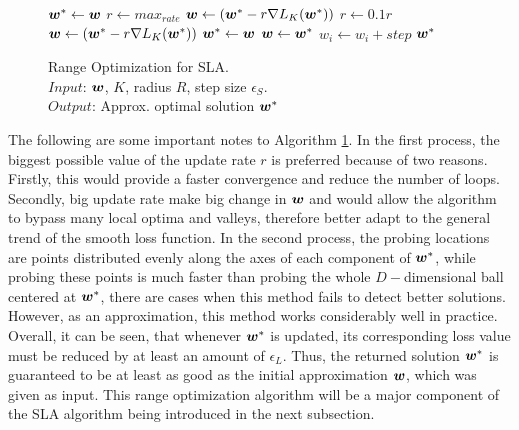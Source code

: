 \begin{figure}[tp!]
\vspace{-3mm}
\caption{\footnotesize
Range Optimization for SLA.\hfill\;\\
\text{\hspace{1.4cm}} $Input$: $\boldsymbol{w}$, $K$, radius $R$, step size $\epsilon_S$. \\
\text{\hspace{1.4cm}} $Output$: Approx. optimal solution $\boldsymbol{w}^*$ 
}
\label{alg:sla.range}
{\footnotesize
\begin{algorithmic}[1]
\Repeat
   \Statex {}
   \State $\boldsymbol{w}^* \gets \boldsymbol{w}$
   \Repeat
      \State $r \gets max_{rate}$
      \State $\boldsymbol{w} \gets (\boldsymbol{w}^* - r \nabla L_K(\boldsymbol{w}^*))$
         \State $r \gets 0.1 r$
         \State $\boldsymbol{w} \gets (\boldsymbol{w}^* - r\nabla L_K(\boldsymbol{w}^*))$
      \EndWhile
         \State $\boldsymbol{w}^* \gets \boldsymbol{w}$
      \EndIf
   \Statex {}
         \State $\boldsymbol{w} \gets \boldsymbol{w}^*$  
         \State $w_i \gets w_i + step$
         \EndIf       
      \EndFor
   \EndFor
{}
\State \Return $\boldsymbol{w}^*$
\EndFunction
\end{algorithmic}}
\vspace{-4mm}
\end{figure}

The following are some important notes to Algorithm
\ref{alg:sla.range}. In the first process, the biggest possible value
of the update rate $r$ is preferred because of two reasons. Firstly,
this would provide a faster convergence and reduce the number of
loops. Secondly, big update rate make big change in $\boldsymbol{w}$ and would
allow the algorithm to bypass many local optima and valleys, therefore
better adapt to the general trend of the smooth loss function. In the
second process, the probing locations are points distributed evenly
along the axes of each component of $\boldsymbol{w}^*$, while probing these points
is much faster than probing the whole $D-$dimensional ball centered at
$\boldsymbol{w}^*$, there are cases when this method fails to detect better
solutions. However, as an approximation, this method works
considerably well in practice. Overall, it can be seen, that whenever
$\boldsymbol{w}^*$ is updated, its corresponding loss value must be reduced by at
least an amount of $\epsilon_L$. Thus, the returned solution $\boldsymbol{w}^*$ is
guaranteed to be at least as good as the initial approximation $\boldsymbol{w}$,
which was given as input. This range optimization algorithm will be a
major component of the SLA algorithm being introduced in the next
subsection.

